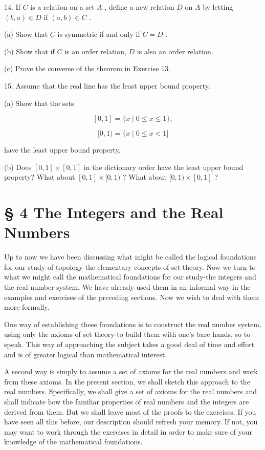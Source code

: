 14. If \(C\) is a relation on a set \(A\) , define a new relation \(D\) on \(A\) by letting \(\left( {b,a}\right)  \in  D\) if \(\left( {a,b}\right)  \in  C\) .

(a) Show that \(C\) is symmetric if and only if \(C = D\) .

(b) Show that if \(C\) is an order relation, \(D\) is also an order relation.

(c) Prove the converse of the theorem in Exercise 13.

15. Assume that the real line has the least upper bound property.

(a) Show that the sets

\[
\left\lbrack  {0,1}\right\rbrack = \{ x \mid  0 \leq  x \leq  1\} ,
\]

\[
\lbrack 0,1) = \{ x \mid  0 \leq  x < 1\rbrack
\]

have the least upper bound property.

(b) Does \(\left\lbrack  {0,1}\right\rbrack \times  \left\lbrack  {0,1}\right\rbrack\) in the dictionary order have the least upper bound property? What about \(\left\lbrack  {0,1}\right\rbrack \times  \lbrack 0,1)\) ? What about \(\lbrack 0,1) \times  \left\lbrack  {0,1}\right\rbrack\) ?

\section*{§ 4 The Integers and the Real Numbers}

Up to now we have been discussing what might be called the logical foundations for our study of topology-the elementary concepts of set theory. Now we turn to what we might call the mathematical foundations for our study-the integers and the real number system. We have already used them in an informal way in the examples and exercises of the preceding sections. Now we wish to deal with them more formally.

One way of establishing these foundations is to construct the real number system, using only the axioms of set theory-to build them with one's bare hands, so to speak. This way of approaching the subject takes a good deal of time and effort and is of greater logical than mathematical interest.

A second way is simply to assume a set of axioms for the real numbers and work from these axioms. In the present section, we shall sketch this approach to the real numbers. Specifically, we shall give a set of axioms for the real numbers and shall indicate how the familiar properties of real numbers and the integers are derived from them. But we shall leave most of the proofs to the exercises. If you have seen all this before, our description should refresh your memory. If not, you may want to work through the exercises in detail in order to make sure of your knowledge of the mathematical foundations.

